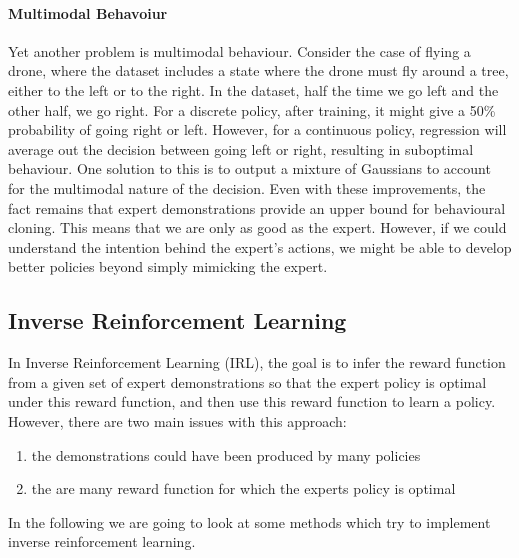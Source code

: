 \paragraph{Multimodal Behavoiur}
Yet another problem is multimodal behaviour. Consider the case of flying a drone, where the 
dataset includes a state where the drone must fly around a tree, either to the left or to 
the right. In the dataset, half the time we go left and the other half, we go right. For a 
discrete policy, after training, it might give a 50\% probability of going right or left. 
However, for a continuous policy, regression will average out the decision between going 
left or right, resulting in suboptimal behaviour. One solution to this is to output a 
mixture of Gaussians to account for the multimodal nature of the decision. \newline\newline 
Even with these improvements, the fact remains that expert demonstrations provide an upper 
bound for behavioural cloning. This means that we are only as good as the expert. However, 
if we could understand the intention behind the expert's actions, we might be able to 
develop better policies beyond simply mimicking the expert.

\subsection{Inverse Reinforcement Learning}
In Inverse Reinforcement Learning (IRL), the goal is to infer the reward function from a 
given set of expert demonstrations so that the expert policy is optimal under this reward function,
and then use this reward function to learn a policy. However, there are two main issues with this approach:
\begin{enumerate}
    \item the demonstrations could have been produced by many policies
    \item the are many reward function for which the experts policy is optimal
\end{enumerate}
In the following we are going to look at some methods which try to implement inverse reinforcement learning. 

